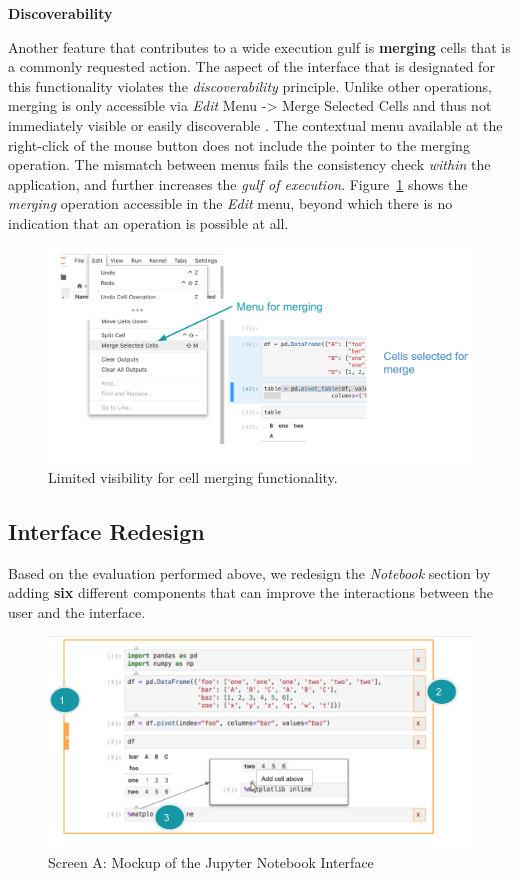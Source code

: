\documentclass[12pt,letterpaper]{article}
\begin{document}
\textbf{Discoverability}

Another feature that contributes to a wide execution gulf is \textbf{merging} cells that is a commonly requested action. The aspect of the interface that is designated for this functionality violates the \textit{discoverability} principle. Unlike other operations, merging is only accessible via \textit{Edit} Menu -> Merge Selected Cells and thus not immediately visible or easily discoverable \cite{jayasimman2011dynamic}. The contextual menu available at the right-click of the mouse button does not include the pointer to the merging operation. The mismatch between menus fails the consistency check \textit{within} the application, and further increases the \textit{gulf of execution}.  Figure~\ref{fig::3} shows the \textit{merging} operation accessible in the \textit{Edit} menu, beyond which there is no indication that an operation is possible at all.

\begin{figure}[hbt!]
\centering
\includegraphics[scale=.4]{figures/project-principles/cell_merge_eval.png}
\caption{Limited visibility for cell merging functionality.}
\label{fig::3}
\end{figure}

\newpage
\subsection*{Interface Redesign}
Based on the evaluation performed above, we redesign the \textit{Notebook} section by adding \textbf{six} different components that can improve the interactions between the user and the interface.

\begin{figure}[hbt!]
\centering
\includegraphics[scale=.5]{figures/project-principles/jupyter_mock_screen_a.png}
\caption{Screen A: Mockup of the Jupyter Notebook Interface}
\label{fig::4}
\end{figure}
\end{document}
